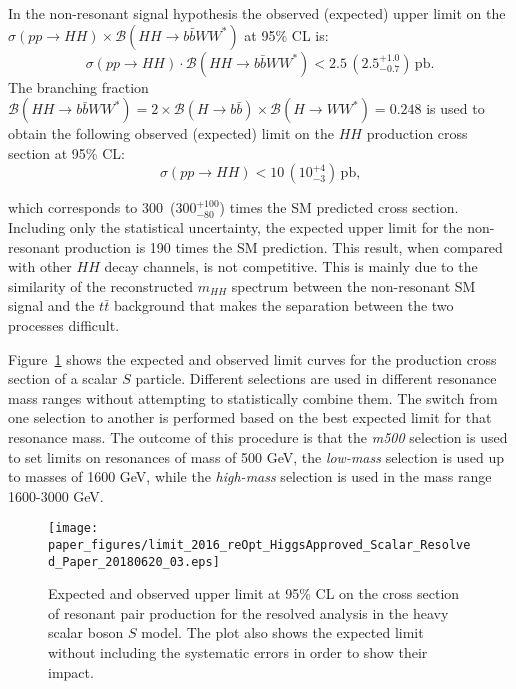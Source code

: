 In the non-resonant signal hypothesis the observed (expected) upper
limit on the $\sigma(pp \to HH) \times {\mathcal{B}}( HH \to b\bar{b}WW^{\ast})$ at 95\%
CL is:
\[
\sigma(pp \to HH) \cdot {\mathcal{B}}(HH \to b\bar{b}WW^{\ast}) < 2.5 \, \left
 (2.5^{+1.0}_{-0.7} \right )  \,
{\mathrm{pb}}.
\]
The branching fraction ${\mathcal{B}}(HH \to b\bar{b}WW^{\ast}) = 2\times
{\mathcal{B}}(H \to b\bar{b}) \times {\mathcal{B}}(H \to WW^{\ast}) = 0.248$ is used to
obtain the following observed (expected) limit on the $HH$ production cross section at 95\% CL:
\[
\sigma(pp \to HH) < 10 \, \left (10^{+4}_{-3} \right) \,  {\text{pb,}}
\]
 
which corresponds to 300~(300$^{+100}_{-80}$) times the SM predicted cross section.
Including only the statistical uncertainty, the expected upper limit for the non-resonant production is
190 times the SM prediction.
This result, when compared with other $HH$ decay channels, is not competitive.  This is mainly  due to the similarity of the reconstructed $m_{HH}$ spectrum between the non-resonant SM signal
and the $t\bar{t}$ background that makes the separation between the
two processes difficult.
 
Figure~\ref{fig:limit} shows the expected and observed limit
curves for the production cross section of a scalar $S$ particle.
Different selections are used in different resonance mass ranges without attempting to statistically combine them. The
switch from one selection to another is performed based on the
best expected limit for that resonance mass.
The outcome of this procedure is that the \emph{m500} selection is used to set limits on resonances of mass of 500 GeV,  the \emph{low-mass}   selection is used up to masses of 1600 GeV, while the \emph{high-mass} selection is used in the mass range 1600-3000 GeV.
 
 
\begin{figure}[!h]
\begin{center}
\texttt{[image: paper\_figures/limit\_2016\_reOpt\_HiggsApproved\_Scalar\_Resolved\_Paper\_20180620\_03.eps]}
\caption[Expected and observed upper limit at 95\% CL on the cross section of resonant pair
         production for the resolved analysis in the heavy scalar boson $S$ model]{Expected and observed upper limit at 95\% CL on the cross section of resonant pair
         production for the resolved analysis in the heavy scalar boson $S$ model. The plot also shows the expected limit
         without including the systematic errors in order to show their impact.
          }
\label{fig:limit}
\end{center}
\end{figure}
 
